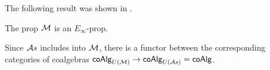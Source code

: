 The following result was shown in \cite{Medina20prop1}.

\begin{proposition}
	The prop $\mathcal{M}$ is an $E_\infty$-prop.
\end{proposition}

Since $\mathcal{A}s$ includes into $\mathcal{M}$, there is a functor between the corresponding categories of coalgebras $\mathsf{coAlg}_{U(\mathcal{M})} \to \mathsf{coAlg}_{U(\mathcal{A}s)} = \mathsf{coAlg}$.
